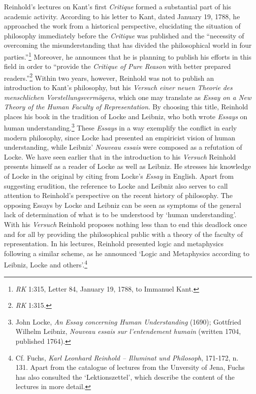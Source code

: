  Reinhold's lectures on Kant's first \textit{Critique }formed a substantial part of his academic activity. According to his letter to Kant, dated January 19, 1788, he approached the work from a historical perspective, elucidating the situation of philosophy immediately before the \textit{Critique} was published and the ``necessity of overcoming the misunderstanding that has divided the philosophical world in four parties.''\footnote{ \textit{RK} 1:315, Letter 84, January 19, 1788, to Immanuel Kant. } Moreover, he announces that he is planning to publish his efforts in this field in order to ``provide the \textit{Critique of Pure Reason} with better prepared readers.''\footnote{ \textit{RK} 1:315. } Within two years, however, Reinhold was not to publish an introduction to Kant's philosophy, but his \textit{Versuch einer neuen Theorie des menschlichen Vorstellungsverm\"{o}gens}, which one may translate as \textit{Essay on a New Theory of the Human Faculty of Representation}. By choosing this title, Reinhold places his book in the tradition of Locke and Leibniz, who both wrote \textit{Essays} on human understanding.\footnote{ John Locke, \textit{An Essay concerning Human Understanding} (1690); Gottfried Wilhelm Leibniz, \textit{Nouveau essais sur l'entendement humain} (written 1704, published 1764). } These \textit{Essays} in a way exemplify the conflict in early modern philosophy, since Locke had presented an empiricist vision of human understanding, while Leibniz' \textit{Nouveau essais} were composed as a refutation of Locke. We have seen earlier that in the introduction to his \textit{Versuch} Reinhold presents himself as a reader of Locke as well as Leibniz. He stresses his knowledge of Locke in the original by citing from Locke's \textit{Essay} in English. Apart from suggesting erudition, the reference to Locke and Leibniz also serves to call attention to Reinhold's perspective on the recent history of philosophy. The opposing Essays by Locke and Leibniz can be seen as symptoms of the general lack of determination of what is to be understood by `human understanding'. With his \textit{Versuch} Reinhold proposes nothing less than to end this deadlock once and for all by providing the philosophical public with a theory of the faculty of representation. In his lectures, Reinhold presented logic and metaphysics following a similar scheme, as he announced `Logic and Metaphysics according to Leibniz, Locke and others'.\footnote{ Cf. Fuchs, \textit{Karl Leonhard Reinhold {--} Illuminat und Philosoph}, 171{-}172, n. 131. Apart from the catalogue of lectures from the Unversity of Jena, Fuchs has also consulted the `Lektionszettel', which describe the content of the lectures in more detail. }


